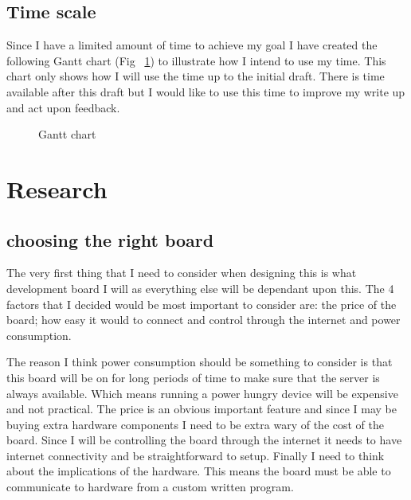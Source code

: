 \documentclass{article}
\begin{document}
\subsection{Time scale}

Since I have a limited amount of time to achieve my goal I have created the following Gantt
chart (Fig ~\ref{fig:Gantt Chart}) to illustrate how I intend to use my time. This chart
only shows how I will use the time up to the initial draft. There is time available after
this draft but I would like to use this time to improve my write up and act upon feedback.

\begin{figure}
    \begin{gantt}[xunitlength=\textwidth / 16]{7}{16}
        \begin{ganttitle}
        \end{ganttitle}
        \begin{ganttitle}
        \end{ganttitle}
    \end{gantt}
    \caption{Gantt chart} \label{fig:Gantt Chart}
\end{figure}

\break
\section{Research}
\subsection{choosing the right board}

The very first thing that I need to consider when designing this is what development board
I will as everything else will be dependant upon this. The 4 factors that I decided would
be most important to consider are: the price of the board; how easy it would to connect
and control through the internet and power consumption.

The reason I think power consumption should be something to consider is that this board will
be on for long periods of time to make sure that the server is always available. Which means
running a power hungry device will be expensive and not practical. The price is an obvious
important feature and since I may be buying extra hardware components I need to be extra wary of
the cost of the board. Since I will be controlling the board through the internet it needs to
have internet connectivity and be straightforward to setup. Finally I need to think about the
implications of the hardware. This means the board must be able to communicate to hardware from
a custom written program.
\end{document}
